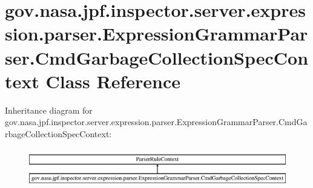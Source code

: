 \hypertarget{classgov_1_1nasa_1_1jpf_1_1inspector_1_1server_1_1expression_1_1parser_1_1_expression_grammar_pa9b16c5c3aaa9986dba28b01bf7446bf9}{}\section{gov.\+nasa.\+jpf.\+inspector.\+server.\+expression.\+parser.\+Expression\+Grammar\+Parser.\+Cmd\+Garbage\+Collection\+Spec\+Context Class Reference}
\label{classgov_1_1nasa_1_1jpf_1_1inspector_1_1server_1_1expression_1_1parser_1_1_expression_grammar_pa9b16c5c3aaa9986dba28b01bf7446bf9}
Inheritance diagram for gov.\+nasa.\+jpf.\+inspector.\+server.\+expression.\+parser.\+Expression\+Grammar\+Parser.\+Cmd\+Garbage\+Collection\+Spec\+Context\+:\begin{figure}[H]
\begin{center}
\leavevmode
\includegraphics[height=1.715161cm]{classgov_1_1nasa_1_1jpf_1_1inspector_1_1server_1_1expression_1_1parser_1_1_expression_grammar_pa9b16c5c3aaa9986dba28b01bf7446bf9}
\end{center}
\end{figure}
